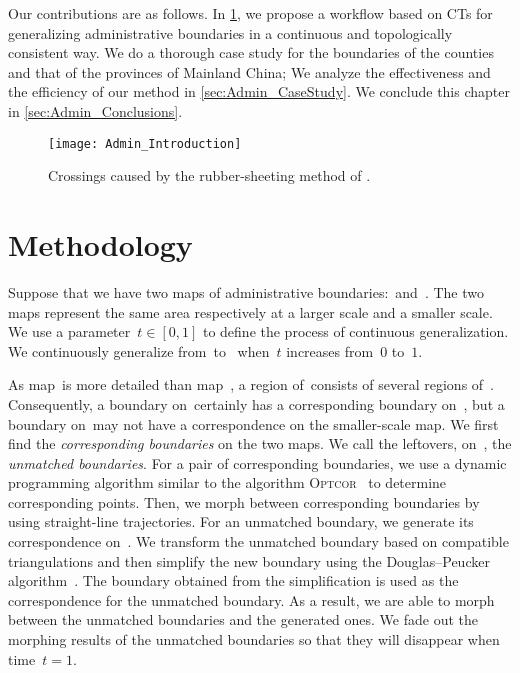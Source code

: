 Our contributions are as follows.
In \sect\ref{sec:Admin_OverallAlgorithm},
we propose a workflow based on CTs 
for generalizing administrative boundaries 
in a continuous and topologically consistent way. 
We do a thorough case study for the boundaries of 
the counties and that of the provinces of Mainland China;  
We analyze the effectiveness and the efficiency of
our method in \sect\ref{sec:Admin_CaseStudy}.  
We conclude this chapter in \sect\ref{sec:Admin_Conclusions}.

\begin{figure}[tb]
	\centering
	\texttt{[image: Admin\_Introduction]}
	\caption{Crossings caused by the rubber-sheeting method of 
	\textcite{Doytsher2001}.}
	\label{fig:Admin_Rubbersheeting}
\end{figure}

\section{Methodology}
\label{sec:Admin_OverallAlgorithm}

Suppose that we have two maps  
of administrative boundaries:~\ml and~\ms.
The two maps represent the same area 
respectively at a larger scale and a smaller scale. 
We use a parameter~$t\in[0,1]$ 
to define the process of continuous generalization.
We continuously generalize from~\ml to~\ms
when~$t$ increases from~$0$ to~$1$.


As map~\ml is more detailed than map~\ms, 
a region of~\ms consists of several regions of~\ml. 
Consequently, a boundary on~\ms certainly 
has a corresponding boundary on~\ml, 
but a boundary on~\ml may not
have a correspondence on the smaller-scale map. 
We first find the \emph{corresponding boundaries} on the two maps.
We call the leftovers, on~\ml, the \emph{unmatched boundaries}. 
For a pair of corresponding boundaries, we
use a dynamic programming algorithm similar to the algorithm 
\textsc{Optcor}~\parencite{Noellenburg2008} to determine 
corresponding points.
Then, we morph between corresponding boundaries 
by using straight-line trajectories. 
For an unmatched boundary, we generate its correspondence on~\ms.
We transform the unmatched boundary based on compatible triangulations 
and then simplify the new boundary using the 
Douglas--Peucker algorithm~\parencite{Douglas1973}.
The boundary obtained from the simplification is used as 
the correspondence for the unmatched boundary.
As a result, we are able to morph 
between the unmatched boundaries and the generated ones. 
We fade out the morphing results of the unmatched boundaries
so that they will disappear when time~$t=1$.

